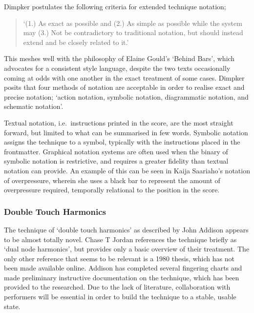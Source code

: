 Dimpker postulates the following criteria for extended technique notation; \begin{quote}
    `(1.) As exact as possible and (2.) As simple as possible while the system may (3.) Not be contradictory to
traditional notation, but should instead extend and be closely related to it.'\autocite[3]{dimpkerExtendedNotationDepiction2012}
\end{quote}
This meshes well with the philosophy of Elaine Gould's `Behind Bars', which advocates for a consistent style language, despite the two texts occasionally coming at odds with one another in the exact treatment of some cases.\autocite[120--121, 61]{dimpkerExtendedNotationDepiction2012,gouldBars2011}
Dimpker posits that four methods of notation are acceptable in order to realise exact and precise notation; `action notation, symbolic notation, diagrammatic notation, and schematic notation'.\autocite[33]{dimpkerExtendedNotationDepiction2012}

Textual notation, i.e.\ instructions printed in the score, are the most straight forward, but limited to what can be summarised in few words.
Symbolic notation assigns the technique to a symbol, typically with the instructions placed in the frontmatter.
Graphical notation systems are often used when the binary of symbolic notation is restrictive, and requires a greater fidelity than textual notation can provide. 
An example of this can be seen in Kaija Saariaho's notation of overpressure, wherein she uses a black bar to represent the amount of overpressure required, temporally relational to the position in the score.\autocite{TODO:saariaho citation}

\subsubsection{Double Touch Harmonics}
The technique of `double touch harmonics' as described by John Addison appears to be almost totally novel. 
Chase T Jordan references the technique briefly as `dual node harmonics', but provides only a basic overview of their treatment.\autocite[36]{jordanOldInstrumentsNew2020}
The only other reference that seems to be relevant is a 1980 thesis, which has not been made available online.\autocite{woodrichMultinodalPerformanceTechnique1980}
Addison has completed several fingering charts and made preliminary instructive documentation on the technique, which has been provided to the researched.
Due to the lack of literature, collaboration with performers will be essential in order to build the technique to a stable, usable state.


